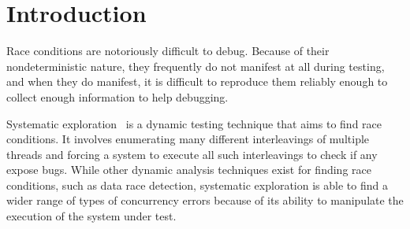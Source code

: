 \documentclass{llncs}
\begin{document}




\section{Introduction}

Race conditions are notoriously difficult to debug.
Because of their nondeterministic nature, they frequently do not manifest at all during testing, and when they do manifest, it is difficult to reproduce them reliably enough to collect enough information to help debugging.

Systematic exploration~\cite{verisoft} is a dynamic testing technique that aims to find race conditions. It involves enumerating many different interleavings of multiple threads and forcing a system to execute all such interleavings to check if any expose bugs.
While other dynamic analysis techniques exist for finding race conditions, such as data race detection, %
systematic exploration is able to find a wider range of types of concurrency errors because of its ability to manipulate the execution of the system under test.

\end{document}
